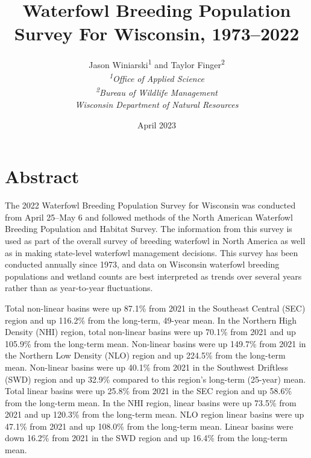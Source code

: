 \documentclass[
  12pt,
]{article}
\title{Waterfowl Breeding Population Survey For Wisconsin, 1973--2022}
\author{Jason Winiarski\textsuperscript{1} and Taylor
Finger\textsuperscript{2}\\
\emph{\textsuperscript{1}Office of Applied Science}\\
\emph{\textsuperscript{2}Bureau of Wildlife Management}\\
\emph{Wisconsin Department of Natural Resources}}
\date{April 2023}
\begin{document}
\maketitle

{
\hypersetup{linkcolor=}
\setcounter{tocdepth}{3}
\tableofcontents
}
\newpage

\hypertarget{abstract}{%
\section{Abstract}\label{abstract}}

The 2022 Waterfowl Breeding Population Survey for Wisconsin was
conducted from April 25--May 6 and followed methods of the North
American Waterfowl Breeding Population and Habitat Survey. The
information from this survey is used as part of the overall survey of
breeding waterfowl in North America as well as in making state-level
waterfowl management decisions. This survey has been conducted annually
since 1973, and data on Wisconsin waterfowl breeding populations and
wetland counts are best interpreted as trends over several years rather
than as year-to-year fluctuations.

Total non-linear basins were up 87.1\% from 2021 in the Southeast
Central (SEC) region and up 116.2\% from the long-term, 49-year mean. In
the Northern High Density (NHI) region, total non-linear basins were up
70.1\% from 2021 and up 105.9\% from the long-term mean. Non-linear
basins were up 149.7\% from 2021 in the Northern Low Density (NLO)
region and up 224.5\% from the long-term mean. Non-linear basins were up
40.1\% from 2021 in the Southwest Driftless (SWD) region and up 32.9\%
compared to this region's long-term (25-year) mean. Total linear basins
were up 25.8\% from 2021 in the SEC region and up 58.6\% from the
long-term mean. In the NHI region, linear basins were up 73.5\% from
2021 and up 120.3\% from the long-term mean. NLO region linear basins
were up 47.1\% from 2021 and up 108.0\% from the long-term mean. Linear
basins were down 16.2\% from 2021 in the SWD region and up 16.4\% from
the long-term mean.
\end{document}
